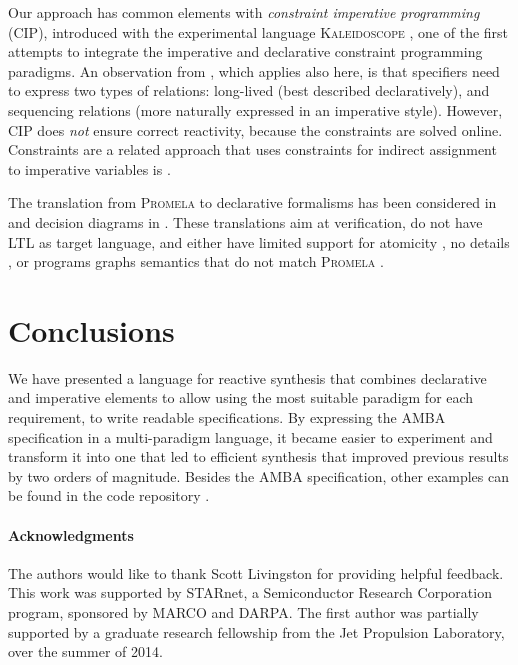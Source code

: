 \documentclass[copyright]{eptcs}
\begin{document}
Our approach has common elements with {\em constraint imperative programming} (CIP), introduced with the experimental language \textsc{Kaleidoscope} \cite{FreemanBenson90ecoop,FreemanBenson92ecoop,FreemanBenson92iccl,Lopez94oopsla}, one of the first attempts to integrate the imperative and declarative constraint programming paradigms.
An observation from \cite{FreemanBenson90ecoop}, which applies also here, is that specifiers need to express two types of relations: long-lived (best described declaratively), and sequencing relations (more naturally expressed in an imperative style).
However, CIP does {\em not} ensure correct reactivity, because the constraints are solved online.
Constraints are a related approach that uses constraints for indirect assignment to imperative variables is \cite{Lamport85popl}.

The translation from \textsc{Promela} to declarative formalisms has been considered in \cite{Baldamus01spin,Yong12spin,Ciesinski08spin} and decision diagrams in \cite{Beaudenon10sttt}.
These translations aim at verification, do not have LTL as target language, and either have limited support for atomicity \cite{Ciesinski08spin}, no details \cite{Baldamus01spin}, or programs graphs semantics that do not match \textsc{Promela} \cite{Yong12spin}.
\clearpage{}
\clearpage{}\section{Conclusions}
\label{sec:conclusions}

We have presented a language for reactive synthesis that combines declarative and imperative elements to allow using the most suitable paradigm for each requirement, to write readable specifications.
By expressing the AMBA specification in a multi-paradigm language, it became easier to experiment and transform it into one that led to efficient synthesis that improved previous results by two orders of magnitude.
Besides the AMBA specification, other examples can be found in the code repository \cite{Filippidis15github-openpromela}.


\paragraph{Acknowledgments}

The authors would like to thank Scott Livingston for providing helpful feedback.
This work was supported by STARnet, a Semiconductor Research Corporation program, sponsored by MARCO and DARPA. 
The first author was partially supported by a graduate research fellowship from the Jet Propulsion Laboratory, over the summer of 2014.




\clearpage{}
\end{document}
